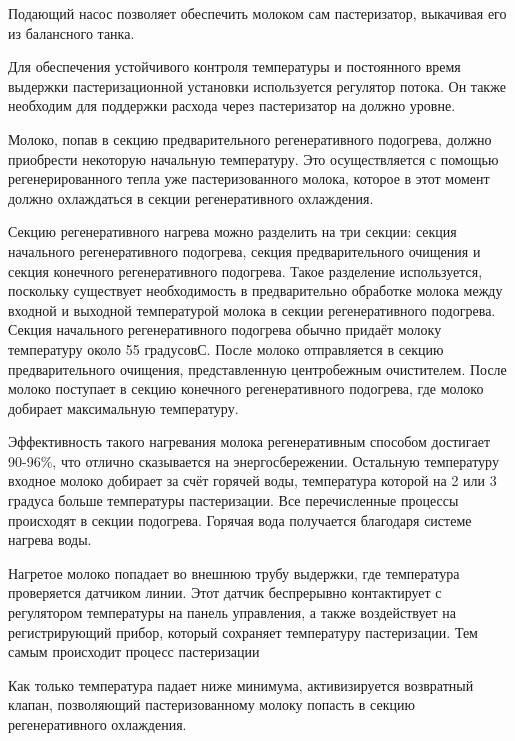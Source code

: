 {  \par \redline Подающий насос позволяет обеспечить молоком сам пастеризатор, выкачивая его из балансного танка. 

  \par \redline Для обеспечения устойчивого контроля температуры и постоянного время выдержки пастеризационной установки используется регулятор потока. Он также необходим для поддержки расхода через пастеризатор на должно уровне.

  \par \redline Молоко, попав в секцию предварительного регенеративного подогрева, должно приобрести некоторую начальную температуру. Это осуществляется с помощью регенерированного тепла уже пастеризованного молока, которое в этот момент должно охлаждаться в секции регенеративного охлаждения. 

  \par \redline Секцию регенеративного нагрева можно разделить на три секции: секция начального регенеративного подогрева, секция предварительного очищения и секция конечного регенеративного подогрева. Такое разделение используется, поскольку существует необходимость в предварительно обработке молока между входной и выходной температурой молока в секции регенеративного подогрева. Секция начального регенеративного подогрева обычно придаёт молоку температуру около 55 градусовС. После молоко отправляется в секцию предварительного очищения, представленную центробежным очистителем. После молоко поступает в секцию конечного регенеративного подогрева, где молоко добирает максимальную температуру. 

  \par \redline Эффективность такого нагревания молока регенеративным способом достигает 90-96\%, что отлично сказывается на энергосбережении. Остальную температуру входное молоко добирает за счёт горячей воды, температура которой на 2 или 3 градуса больше температуры пастеризации. Все перечисленные процессы происходят в секции подогрева. Горячая вода получается благодаря системе нагрева воды.

  \par \redline Нагретое молоко попадает во внешнюю трубу выдержки, где температура проверяется датчиком линии. Этот датчик беспрерывно контактирует с регулятором температуры на панель управления, а также воздействует на регистрирующий прибор, который сохраняет температуру пастеризации. Тем самым происходит процесс пастеризации

  \par \redline Как только температура падает ниже минимума, активизируется возвратный клапан, позволяющий пастеризованному молоку попасть в секцию регенеративного охлаждения.
  
}
